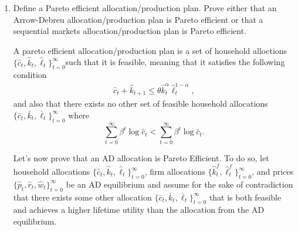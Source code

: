 \documentclass[11pt,english]{article}
\begin{document}
\begin{enumerate}[label=(\alph*)]
\begin{solution}
Now, for the opposite direction, consider the Sequential Markets equilibrium of household allocations $\{( \bar{c}_t, \bar{k}_{t+1}, \bar{b}_{t+1}, \bar{\ell}_{t+1})\}_{t=0}^\infty$, firm allocations $\{\bar{k}_t^f, \bar{\ell}_t^f\}_{t=0}^\infty$, and prices $\{\bar{r}_t^k, \bar{r}^b_t, \bar{w}_t\}$. We can then write the corresponding Arrow Debreu equilibrium of household allocations $\{\hat{c}_t, \hat{k}_{t}, \hat{\ell}_t\}_{t=0}^\infty$, firm allocations $\{\hat{k}_t^f, \hat{\ell}_t^f\}_{t=0}^\infty$, and prices $\{\hat{p}_t, \hat{r}_t, \hat{w}_t\}_{t=0}^\infty$ to be:
\begin{itemize}
\item $\hat{c}_t = \bar{c}_t$, $\hat{k}_t = \bar{k}_t$, $\hat{\ell}_t = \bar{\ell}_t$, $\hat{\ell}^f_t = \bar{\ell}_t^f$, $\hat{k}_t^f = \bar{k}_t^f$ for all $t\geq 0$.
\item Set numeraire $\hat{p}_0 = 1$, then we also have $\hat{p}_t = \Pi_{i=1}^t \frac{1}{\bar{r}_t^k}$
\item $\hat{r}_t = \hat{p}_t \bar{r}_t^k$  and $\hat{w}_t = \hat{p}_t \bar{w}_t$ 
\end{itemize}
\end{solution}
    \item Define a Pareto efficient allocation/production plan. Prove either that an Arrow-Debreu allocation/production plan is Pareto efficient or that a sequential markets allocation/production plan is Pareto efficient.
\begin{solution}
A pareto efficient allocation/production plan is a set of household alloctions $\{\hat{c}_t, \hat{k}_{t}, \hat{\ell}_t\}_{t=0}^\infty$such that it is feasible, meaning that it satisfies the following condition
\begin{align*}
\hat{c}_t + \hat{k}_{t+1}  \leq \theta \hat{k}_t^\alpha \hat{\ell}_t^{1 - \alpha},
\end{align*} 
and also that there exists no other set of feasible household allocations $\{\bar{c}_t, \bar{k}_{t}, \bar{\ell}_t\}_{t=0}^\infty$ where $$\sum_{t=0}^\infty \beta^t \log \hat{c}_t < \sum_{t=0}^\infty \beta^t \log \bar{c}_t.$$

Let's now prove that an AD allocation is Pareto Efficient. To do so, let household allocations $\{\hat{c}_t, \hat{k}_{t}, \hat{\ell}_t\}_{t=0}^\infty$, firm allocations $\{\hat{k}_t^f, \hat{\ell}_t^f\}_{t=0}^\infty$, and prices $\{\hat{p}_t, \hat{r}_t, \hat{w}_t\}_{t=0}^\infty$ be an AD equilibrium and assume for the sake of contradiction that there exists some other allocation  $\{\bar{c}_t, \bar{k}_{t}, \bar{\ell}_t\}_{t=0}^\infty$ that is both feasible and achieves a higher lifetime utility than the allocation from the AD equilibrium.


\end{solution}
\end{enumerate}
\end{document}
